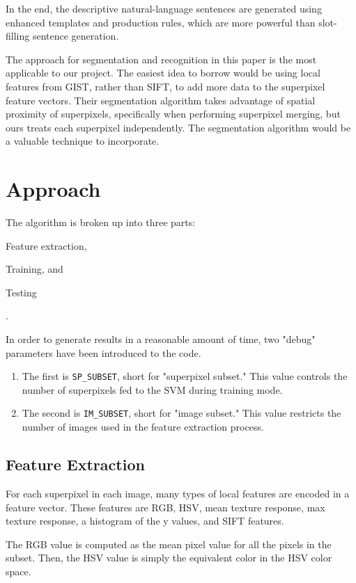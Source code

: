 \documentclass[10pt,twocolumn,letterpaper]{article}
\begin{document}
In the end, the descriptive natural-language sentences are generated using enhanced templates and production rules, which are more powerful than slot-filling sentence generation.

The approach for segmentation and recognition in this paper is the most applicable to our project.  The easiest idea to borrow would be using local features from GIST, rather than SIFT, to add more data to the superpixel feature vectors.  Their segmentation algorithm takes advantage of spatial proximity of superpixels, specifically when performing superpixel merging, but ours treats each superpixel independently.  The segmentation algorithm would be a valuable technique to incorporate.

\section{Approach}

The algorithm is broken up into three parts: \begin{inparaenum}
\item Feature extraction, \item Training, and \item Testing
\end{inparaenum}.

In order to generate results in a reasonable amount of time, two "debug" parameters have been introduced to the code.
\begin{enumerate}
\item The first is \texttt{SP\_SUBSET}, short for "superpixel subset." This value controls the number of superpixels fed to the SVM during training mode.
\item The second is \texttt{IM\_SUBSET}, short for "image subset." This value restricts the number of images used in the feature extraction process.
\end{enumerate}

\subsection{Feature Extraction}

For each superpixel in each image, many types of local features are encoded in a feature vector.  These features are RGB, HSV, mean texture response, max texture response, a histogram of the y values, and SIFT features.

The RGB value is computed as the mean pixel value for all the pixels in the subset. Then, the HSV value is simply the equivalent color in the HSV color space.
\end{document}
